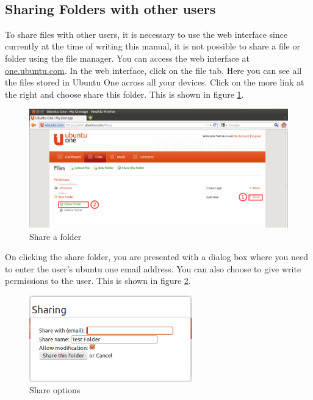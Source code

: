 \par \noindent {} \\

\subsection*{Sharing Folders with other users} 
To share files with other users, it is necessary to use the web interface since currently at the time of writing this manual, it is not possible to share a file or folder using the file manager. You can access the web interface at \href{https://one.ubuntu.com/}{one.ubuntu.com}. In the web interface, click on the file tab. Here you can see all the files stored in Ubuntu One across all your devices. Click on the more link at the right and choose share this folder. This is shown in figure \ref{fig:share-folder}. \\

\begin{figure}[h!]	
	\centering
	\includegraphics[width=400pt]{./images/basic-tasks/share-folder.png}
	\caption{Share a folder}	
	\label{fig:share-folder}		
\end{figure}

\par \noindent On clicking the share folder, you are presented with a dialog box where you need to enter the user's ubuntu one email address. You can also choose to give write permissions to the user. This is shown in figure \ref{fig:share-folder2}.

\begin{figure}[h!]	
	\centering
	\includegraphics[width=200pt]{./images/basic-tasks/share-folder2.png}
	\caption{Share options}	
	\label{fig:share-folder2}		
\end{figure}

